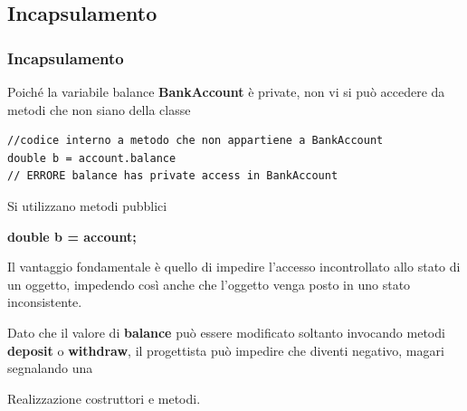 \subsection*{Incapsulamento}
\begin{frame}[fragile]
\frametitle{Incapsulamento}
\begin{block}{}
Poiché la variabile balance \textbf{BankAccount} è private, non vi si può accedere da metodi che non siano della 
classe
\end{block}
\begin{lstlisting}
//codice interno a metodo che non appartiene a BankAccount
double b = account.balance
// ERRORE balance has private access in BankAccount
\end{lstlisting}
\begin{block}{Si utilizzano metodi pubblici}
\begin{center}
\textbf{double b = account;}
\end{center}
\end{block}
\end{frame}

\begin{frame}
\begin{block}{}
Il vantaggio fondamentale è quello di \alert{impedire l'accesso incontrollato} allo stato di un oggetto, impedendo
così anche che l'oggetto venga posto in uno stato inconsistente.
\end{block}
\begin{block}{}
Dato che il valore di \textbf{balance} può essere modificato soltanto invocando metodi \textbf{deposit} o 
\textbf{withdraw}, il progettista può impedire che diventi negativo, magari segnalando una 
\end{block}
\end{frame}

\begin{frame}
\begin{huge}
\begin{block}{}
Realizzazione costruttori e metodi.
\end{block}
\end{huge}
\end{frame}
